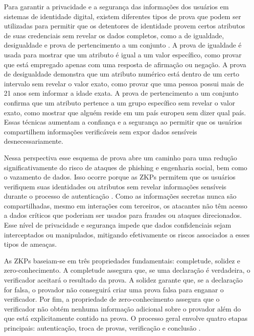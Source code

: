 Para garantir a privacidade e a segurança das informações dos usuários em sistemas de identidade digital, existem diferentes tipos de prova que podem ser utilizadas para permitir que os detentores de identidade provem certos atributos de suas credenciais sem revelar os dados completos, como a de igualdade, desigualdade e prova de pertencimento a um conjunto \cite{Sovrin_ZKP}. A prova de igualdade é usada para mostrar que um atributo é igual a um valor específico, como provar que está empregado apenas com uma resposta de afirmação ou negação. A prova de desigualdade demonstra que um atributo numérico está dentro de um certo intervalo sem revelar o valor exato, como provar que uma pessoa possui mais de 21 anos sem informar a idade exata. A prova de pertencimento a um conjunto confirma que um atributo pertence a um grupo específico sem revelar o valor exato, como mostrar que alguém reside em um país europeu sem dizer qual país. Essas técnicas aumentam a confiança e a segurança ao permitir que os usuários compartilhem informações verificáveis sem expor dados sensíveis desnecessariamente.

Nessa perspectiva esse esquema de prova abre um caminho para uma redução significativamente do risco de ataques de phishing e engenharia social, bem como o vazamento de dados. Isso ocorre porque as \acs{ZKP}s permitem que os usuários verifiquem suas identidades ou atributos sem revelar informações sensíveis durante o processo de autenticação \cite{Farias2024ZKP}. Como as informações secretas nunca são compartilhadas, mesmo em interações com terceiros, os atacantes não têm acesso a dados críticos que poderiam ser usados para fraudes ou ataques direcionados. Esse nível de privacidade e segurança impede que dados confidenciais sejam interceptados ou manipulados, mitigando efetivamente os riscos associados a esses tipos de ameaças.


 As \acs{ZKP}s baseiam-se em três propriedades fundamentais: completude, solidez e zero-conhecimento. A completude assegura que, se uma declaração é verdadeira, o verificador aceitará o resultado da prova. A solidez garante que, se a declaração for falsa, o provador não conseguirá criar uma prova falsa para enganar o verificador. Por fim, a propriedade de zero-conhecimento assegura que o verificador não obtém nenhuma informação adicional sobre o provador além do que está explicitamente contido na prova. O processo geral envolve quatro etapas principais: autenticação, troca de provas, verificação e conclusão \cite{Farias2024ZKP}.

